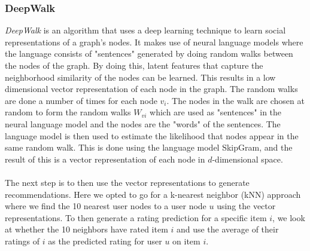 \subsubsection{DeepWalk}
\textit{DeepWalk} is an algorithm that uses a deep learning technique to learn social representations of a graph's nodes\cite{DeepWalk}.
It makes use of neural language models where the language consists of "sentences" generated by doing random walks between the nodes of the graph.
By doing this, latent features that capture the neighborhood similarity of the nodes can be learned.
This results in a low dimensional vector representation of each node in the graph.
The random walks are done a number of times for each node $v_i$.
The nodes in the walk are chosen at random to form the random walks $W_{vi}$ which are used as "sentences" in the neural language model and the nodes are the "words" of the sentences.
The language model is then used to estimate the likelihood that nodes appear in the same random walk.
This is done using the language model SkipGram, and the result of this is a vector representation of each node in $d$-dimensional space.
\\\\
The next step is to then use the vector representations to generate recommendations.
Here we opted to go for a k-nearest neighbor (kNN) approach where we find the 10 nearest user nodes to a user node $u$ using the vector representations.
To then generate a rating prediction for a specific item $i$, we look at whether the 10 neighbors have rated item $i$ and use the average of their ratings of $i$ as the predicted rating for user $u$ on item $i$.
